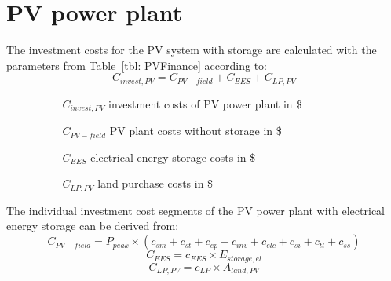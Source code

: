 \section{PV power plant}
The investment costs for the PV system with storage are calculated with the parameters from Table~\ref{tbl: PVFinance} according to:
\begin{equation}
C_{invest,PV} = C_{PV-field}+C_{EES}+C_{LP,PV}
\end{equation} 
\begin{itemize}
\item[ ] 
\begin{itemize}
\item[ ] 
\begin{itemize}
\item[$C_{invest,PV}$]investment costs of PV power plant in \$
\item[$C_{PV-field}$]PV plant costs without storage in \$
\item[$C_{EES}$]electrical energy storage costs in \$
\item[$C_{LP,PV}$]land purchase costs in \$
\end{itemize}
\end{itemize}
\end{itemize}
The individual investment cost segments of the PV power plant with electrical energy storage can be derived from:
\begin{equation}
C_{PV-field} = P_{peak} \times (c_{sm}+c_{st}+c_{ep}+c_{inv}+c_{elc}+c_{si}+c_{tl}+c_{ss})
\end{equation} 
\begin{equation}
C_{EES} = c_{EES} \times E_{storage,el}
\end{equation}
\begin{equation}
C_{LP,PV} = c_{LP}\times A_{land,PV}
\end{equation} 
